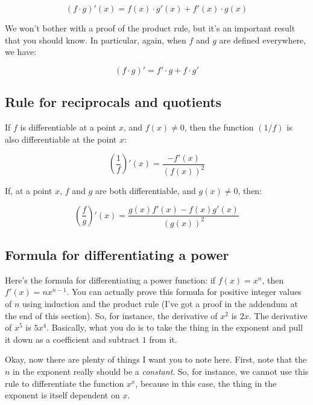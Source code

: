 \documentclass[10pt]{amsart}
\begin{document}
\begin{equation*}
  (f \cdot g)'(x) = f(x) \cdot g'(x) + f'(x) \cdot g(x)
\end{equation*}

We won't bother with a proof of the product rule, but it's an
important result that you should know. In particular, again, when $f$
and $g$ are defined everywhere, we have:

\begin{equation*}
  (f \cdot g)' = f' \cdot g + f \cdot g'
\end{equation*}

\subsection{Rule for reciprocals and quotients}

If $f$ is differentiable at a point $x$, and $f(x) \ne 0$, then the
function $(1/f)$ is also differentiable at the point $x$:

\begin{equation*}
  \left(\frac{1}{f}\right)'(x) = \frac{-f'(x)}{(f(x))^2}
\end{equation*}

If, at a point $x$, $f$ and $g$ are both differentiable, and $g(x) \ne
0$, then:

\begin{equation*}
  \left(\frac{f}{g}\right)'(x) = \frac{g(x)f'(x) - f(x)g'(x)}{(g(x))^2}
\end{equation*}

\subsection{Formula for differentiating a power}

Here's the formula for differentiating a power function: if $f(x) =
x^n$, then $f'(x) = nx^{n-1}$. You can actually prove this formula for
positive integer values of $n$ using induction and the product rule
(I've got a proof in the addendum at the end of this section). So, for
instance, the derivative of $x^2$ is $2x$. The derivative of $x^5$ is
$5x^4$. Basically, what you do is to take the thing in the exponent
and pull it down as a coefficient and subtract $1$ from it.

Okay, now there are plenty of things I want you to note here. First,
note that the $n$ in the exponent really should be a {\em
constant}. So, for instance, we cannot use this rule to differentiate
the function $x^x$, because in this case, the thing in the exponent is
itself dependent on $x$. 
\end{document}
